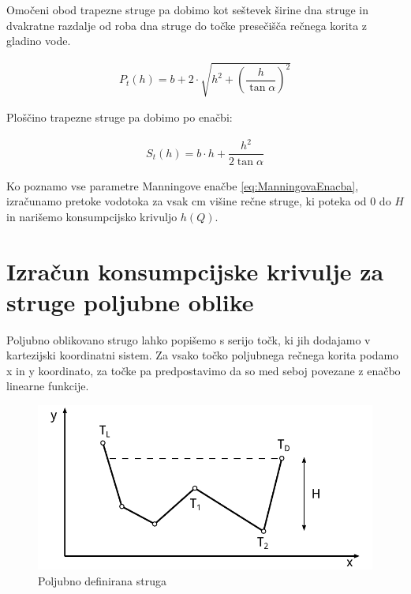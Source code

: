 \begin{enumerate}
	Omočeni obod trapezne struge pa dobimo kot seštevek širine dna struge in dvakratne razdalje od roba dna struge do točke presečišča rečnega korita z gladino vode.
	
	\begin{ceqn}
	\begin{align}
	P_{t}(h) = b + 2 \cdot \sqrt{h^2 + \left(\dfrac{h} {\tan\alpha} \right)^{2}}
	\end{align}
	\end{ceqn}
	
	Ploščino trapezne struge pa dobimo po enačbi:
	\begin{ceqn}
	\begin{align}
	S_{t}(h) = b \cdot h + \dfrac{h^2}{ 2\tan\alpha}
	\end{align}
	\end{ceqn}
	
\end{enumerate}



Ko poznamo vse parametre Manningove enačbe \ref{eq:ManningovaEnacba}, izračunamo pretoke vodotoka za vsak cm višine rečne struge, ki poteka od 0 do $H$ in narišemo konsumpcijsko krivuljo $h(Q)$.


\newpage
\section{Izračun konsumpcijske krivulje za struge poljubne oblike}\label{sec:pretokNumericnaMetoda}


Poljubno oblikovano strugo lahko popišemo s serijo točk, ki jih dodajamo v kartezijski koordinatni sistem. Za vsako točko poljubnega rečnega korita podamo x in y koordinato, za točke pa predpostavimo da so med seboj povezane z enačbo linearne funkcije. 

\begin{figure}[ht!]
	\begin{centering}
		\includegraphics{slike/customChannel/customStruga.pdf}		
		\caption{Poljubno definirana struga}\label{fig:poljubnaStruga}
	\end{centering}
\end{figure}




